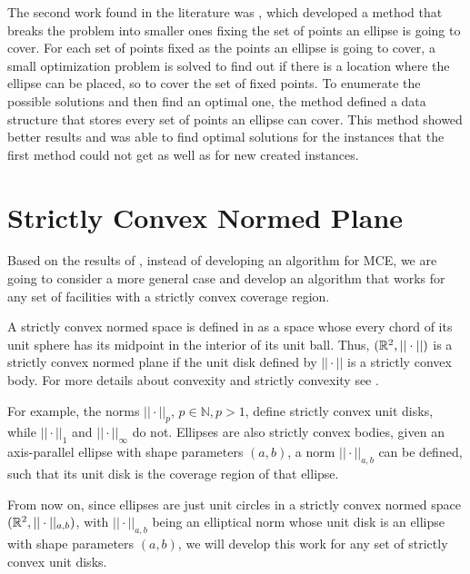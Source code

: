 The second work found in the literature was , which developed a method that breaks the problem into smaller ones fixing the set of points an ellipse is going to cover. For each set of points fixed as the points an ellipse is going to cover, a small optimization problem is solved to find out if there is a location where the ellipse can be placed, so to cover the set of fixed points. To enumerate the possible solutions and then find an optimal one, the method defined a data structure that stores every set of points an ellipse can cover. This method showed better results and was able to find optimal solutions for the instances that the first method could not get as well as for new created instances.

\section{Strictly Convex Normed Plane}

Based on the results of , instead of developing an algorithm for MCE, we are going to consider a more general case and develop an algorithm that works for any set of facilities with a strictly convex coverage region.

A strictly convex normed space is defined in  as a space whose every chord of its unit sphere has its midpoint in the interior of its unit ball.
Thus, $(\mathbb{R}^2, ||\cdot||)$ is a strictly convex normed plane if the unit disk defined by $||\cdot||$ is a strictly convex body. For more details about convexity and strictly convexity see .

For example, the norms $||\cdot||_p$, $p\in \mathbb{N}, p>1$, define strictly convex unit disks, while $||\cdot||_1$ and $||\cdot||_{\infty}$ do not.
Ellipses are also strictly convex bodies, given an axis-parallel ellipse with shape parameters $(a, b)$, a norm $||\cdot||_{a,b}$ can be defined, such that its unit disk is the coverage region of that ellipse.

From now on, since ellipses are just unit circles in a strictly convex normed space $(\mathbb{R}^2, ||\cdot||_{a,b})$, with $||\cdot||_{a, b}$ being an elliptical norm whose unit disk is an ellipse with shape parameters $(a, b)$, we will develop this work for any set of strictly convex unit disks. 


